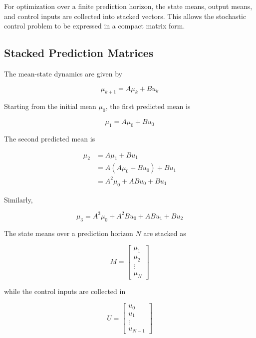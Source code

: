 For optimization over a finite prediction horizon, the state means, output means, and control inputs are collected into stacked vectors. This allows the stochastic control problem to be expressed in a compact matrix form.

\subsection{Stacked Prediction Matrices}

The mean-state dynamics are given by

\begin{equation}
    \mu_{k+1}
    =
    A\mu_k+Bu_k
\end{equation}

Starting from the initial mean \(\mu_0\), the first predicted mean is

\begin{equation}
    \mu_1
    =
    A\mu_0+Bu_0
\end{equation}

The second predicted mean is

\begin{align}
    \mu_2
    &=
    A\mu_1+Bu_1 \\
    &=
    A(A\mu_0+Bu_0)+Bu_1 \\
    &=
    A^2\mu_0+ABu_0+Bu_1
\end{align}

Similarly,

\begin{equation}
    \mu_3
    =
    A^3\mu_0
    +
    A^2Bu_0
    +
    ABu_1
    +
    Bu_2
\end{equation}

The state means over a prediction horizon \(N\) are stacked as

\begin{equation}
    M
    =
    \begin{bmatrix}
        \mu_1 \\
        \mu_2 \\
        \vdots \\
        \mu_N
    \end{bmatrix}
\end{equation}

while the control inputs are collected in

\begin{equation}
    U
    =
    \begin{bmatrix}
        u_0 \\
        u_1 \\
        \vdots \\
        u_{N-1}
    \end{bmatrix}
\end{equation}

